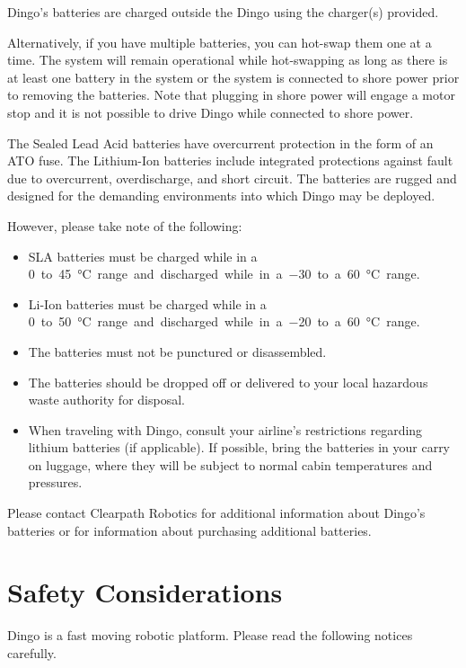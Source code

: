 \documentclass[]{clearpath-latex/clearpath-manual}
\begin{document}
Dingo's batteries are charged outside the Dingo using the charger(s) provided.

Alternatively, if you have multiple batteries, you can hot-swap them one at a time. The system will remain operational while hot-swapping as long as there is at least one battery in the system or the system is connected to shore power prior to removing the batteries. Note that plugging in shore power will engage a motor stop and it is not possible to drive Dingo while connected to shore power.

The Sealed Lead Acid batteries have overcurrent protection in the form of an ATO fuse. The Lithium-Ion batteries include integrated protections against fault due to overcurrent, overdischarge,
and short circuit. The batteries are rugged and designed for the demanding environments into
which Dingo may be deployed.

However, please take note of the following:

\begin{itemize}
\item SLA batteries must be charged while in a \SI{0} to \SI{45}{\celsius} range and discharged while in a \SI{-30} to a \SI{60}{\celsius} range.
\item Li-Ion batteries must be charged while in a \SI{0} to \SI{50}{\celsius} range and discharged while in a \SI{-20} to a \SI{60}{\celsius} range.
\item The batteries must not be punctured or disassembled.
\item The batteries should be dropped off or delivered to your local hazardous waste authority for disposal.
\item When traveling with Dingo, consult your airline's restrictions regarding lithium
	batteries (if applicable). If possible, bring the batteries in your carry on luggage, where they will
be subject to normal cabin temperatures and pressures.
\end{itemize}

Please contact Clearpath Robotics for additional information about Dingo's batteries or
for information about purchasing additional batteries.


\section{Safety Considerations}

Dingo is a fast moving robotic platform. Please read the following notices carefully.
\end{document}
